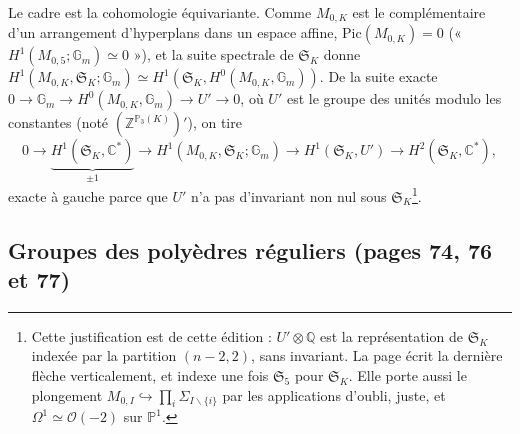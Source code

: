 \documentclass[11pt,a4paper]{article}
\begin{document}
Le cadre est la cohomologie équivariante. Comme $M_{0,K}$ est le complémentaire
d'un arrangement d'hyperplans dans un espace affine, $\mathrm{Pic}(M_{0,K}) = 0$
(« $H^1(M_{0,5}; \mathbb{G}_m) \simeq 0$ »), et la suite spectrale de
$\mathfrak{S}_K$ donne $H^1(M_{0,K}, \mathfrak{S}_K; \mathbb{G}_m) \simeq
H^1(\mathfrak{S}_K, H^0(M_{0,K}, \mathbb{G}_m))$. De la suite exacte $0 \to
\mathbb{G}_m \to H^0(M_{0,K}, \mathbb{G}_m) \to U' \to 0$, où $U'$ est le
groupe des unités modulo les constantes (noté $(\mathbb{Z}^{\mathbb{P}_3(K)})'$),
on tire
\[
0 \to \underbrace{H^1(\mathfrak{S}_K, \mathbb{C}^{*})}_{\pm 1} \to
H^1(M_{0,K}, \mathfrak{S}_K; \mathbb{G}_m) \to H^1(\mathfrak{S}_K, U') \to
H^2(\mathfrak{S}_K, \mathbb{C}^{*}),
\]
exacte à gauche parce que $U'$ n'a pas d'invariant non nul sous
$\mathfrak{S}_K$\footnote{Cette justification est de cette édition :
$U' \otimes \mathbb{Q}$ est la représentation de $\mathfrak{S}_K$ indexée par
la partition $(n-2, 2)$, sans invariant. La page écrit la dernière flèche
verticalement, et indexe une fois $\mathfrak{S}_5$ pour $\mathfrak{S}_K$. Elle
porte aussi le plongement $M_{0,I} \hookrightarrow \prod_i \Sigma_{I
\smallsetminus\{i\}}$ par les applications d'oubli, juste, et $\Omega^1 \simeq
\mathcal{O}(-2)$ sur $\mathbb{P}^1$.}.

\begin{center}
\end{center}

\subsection*{Groupes des polyèdres réguliers (pages 74, 76 et 77)}
\end{document}
